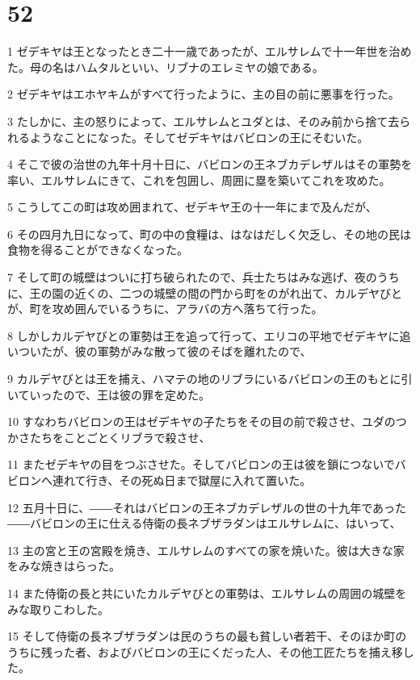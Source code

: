 \chapter{52}

\par 1 ゼデキヤは王となったとき二十一歳であったが、エルサレムで十一年世を治めた。母の名はハムタルといい、リブナのエレミヤの娘である。
\par 2 ゼデキヤはエホヤキムがすべて行ったように、主の目の前に悪事を行った。
\par 3 たしかに、主の怒りによって、エルサレムとユダとは、そのみ前から捨て去られるようなことになった。そしてゼデキヤはバビロンの王にそむいた。
\par 4 そこで彼の治世の九年十月十日に、バビロンの王ネブカデレザルはその軍勢を率い、エルサレムにきて、これを包囲し、周囲に塁を築いてこれを攻めた。
\par 5 こうしてこの町は攻め囲まれて、ゼデキヤ王の十一年にまで及んだが、
\par 6 その四月九日になって、町の中の食糧は、はなはだしく欠乏し、その地の民は食物を得ることができなくなった。
\par 7 そして町の城壁はついに打ち破られたので、兵士たちはみな逃げ、夜のうちに、王の園の近くの、二つの城壁の間の門から町をのがれ出て、カルデヤびとが、町を攻め囲んでいるうちに、アラバの方へ落ちて行った。
\par 8 しかしカルデヤびとの軍勢は王を追って行って、エリコの平地でゼデキヤに追いついたが、彼の軍勢がみな散って彼のそばを離れたので、
\par 9 カルデヤびとは王を捕え、ハマテの地のリブラにいるバビロンの王のもとに引いていったので、王は彼の罪を定めた。
\par 10 すなわちバビロンの王はゼデキヤの子たちをその目の前で殺させ、ユダのつかさたちをことごとくリブラで殺させ、
\par 11 またゼデキヤの目をつぶさせた。そしてバビロンの王は彼を鎖につないでバビロンへ連れて行き、その死ぬ日まで獄屋に入れて置いた。
\par 12 五月十日に、――それはバビロンの王ネブカデレザルの世の十九年であった――バビロンの王に仕える侍衛の長ネブザラダンはエルサレムに、はいって、
\par 13 主の宮と王の宮殿を焼き、エルサレムのすべての家を焼いた。彼は大きな家をみな焼きはらった。
\par 14 また侍衛の長と共にいたカルデヤびとの軍勢は、エルサレムの周囲の城壁をみな取りこわした。
\par 15 そして侍衛の長ネブザラダンは民のうちの最も貧しい者若干、そのほか町のうちに残った者、およびバビロンの王にくだった人、その他工匠たちを捕え移した。
